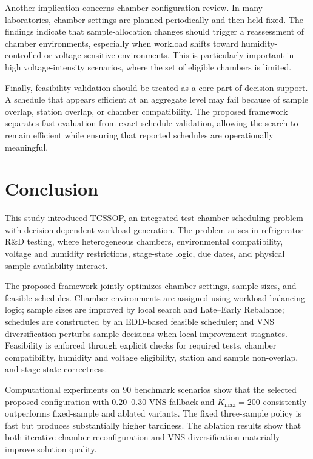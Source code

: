 \documentclass[11pt]{article}
\begin{document}
Another implication concerns chamber configuration review. In many laboratories, chamber settings are planned periodically and then held fixed. The findings indicate that sample-allocation changes should trigger a reassessment of chamber environments, especially when workload shifts toward humidity-controlled or voltage-sensitive environments. This is particularly important in high voltage-intensity scenarios, where the set of eligible chambers is limited.

Finally, feasibility validation should be treated as a core part of decision support. A schedule that appears efficient at an aggregate level may fail because of sample overlap, station overlap, or chamber compatibility. The proposed framework separates fast evaluation from exact schedule validation, allowing the search to remain efficient while ensuring that reported schedules are operationally meaningful.

\section{Conclusion}
\label{sec:conc}

This study introduced TCSSOP, an integrated test-chamber scheduling problem with decision-dependent workload generation. The problem arises in refrigerator R\&D testing, where heterogeneous chambers, environmental compatibility, voltage and humidity restrictions, stage-state logic, due dates, and physical sample availability interact.

The proposed framework jointly optimizes chamber settings, sample sizes, and feasible schedules. Chamber environments are assigned using workload-balancing logic; sample sizes are improved by local search and Late--Early Rebalance; schedules are constructed by an EDD-based feasible scheduler; and VNS diversification perturbs sample decisions when local improvement stagnates. Feasibility is enforced through explicit checks for required tests, chamber compatibility, humidity and voltage eligibility, station and sample non-overlap, and stage-state correctness.

Computational experiments on 90 benchmark scenarios show that the selected proposed configuration with \(0.20\)--\(0.30\) VNS fallback and \(K_{\max}=200\) consistently outperforms fixed-sample and ablated variants. The fixed three-sample policy is fast but produces substantially higher tardiness. The ablation results show that both iterative chamber reconfiguration and VNS diversification materially improve solution quality.
\end{document}
